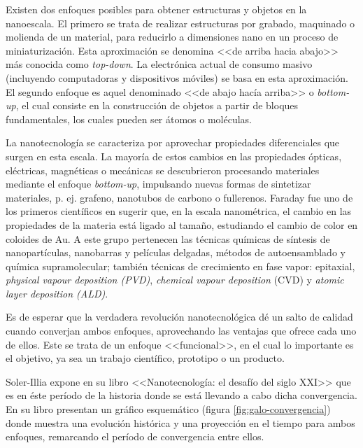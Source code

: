 		Existen dos enfoques posibles para obtener estructuras y objetos en la nanoescala. El primero se trata de realizar estructuras por grabado, maquinado o molienda de un material, para reducirlo a dimensiones nano en un proceso de miniaturización. Esta aproximación se denomina <<de arriba hacia abajo>> más conocida como \textit{top-down}. La electrónica actual de consumo masivo (incluyendo computadoras y dispositivos móviles) se basa en esta aproximación. El segundo enfoque es aquel denominado <<de abajo hacía arriba>> o \textit{bottom-up}, el cual consiste en la construcción de objetos a partir de bloques fundamentales, los cuales pueden ser átomos o moléculas. 

		La nanotecnología se caracteriza por aprovechar propiedades diferenciales que surgen en esta escala. La mayoría de estos cambios en las propiedades ópticas, eléctricas, magnéticas o mecánicas se descubrieron procesando materiales mediante el enfoque \textit{bottom-up}, impulsando nuevas formas de sintetizar materiales, p. ej. grafeno, nanotubos de carbono o fullerenos. Faraday fue uno de los primeros científicos en sugerir que, en la escala nanométrica, el cambio en las propiedades de la materia está ligado al tamaño, estudiando el cambio de color en coloides de Au\cite{faraday1857}. A este grupo pertenecen las técnicas químicas de síntesis de nanopartículas, nanobarras y películas delgadas, métodos de autoensamblado y química supramolecular; también técnicas de crecimiento en fase vapor: epitaxial, \textit{physical vapour deposition (PVD)}, \textit{chemical vapour deposition} (CVD) y \textit{atomic layer deposition (ALD)}.
			
		Es de esperar que la verdadera revolución nanotecnológica dé un salto de calidad cuando converjan ambos enfoques, aprovechando las ventajas que ofrece cada uno de ellos. Este se trata de un enfoque <<funcional>>, en el cual lo importante es el objetivo, ya sea un trabajo científico, prototipo o un producto.

		 Soler-Illia expone en su libro <<Nanotecnología: el desafío del siglo XXI>>\cite{nanotecnologia-galo} que es en éste período de la historia donde se está llevando a cabo dicha convergencia. En su libro presentan un gráfico esquemático (figura \ref{fig:galo-convergencia}) donde muestra una evolución histórica y una proyección en el tiempo para ambos enfoques, remarcando el período de convergencia entre ellos.

